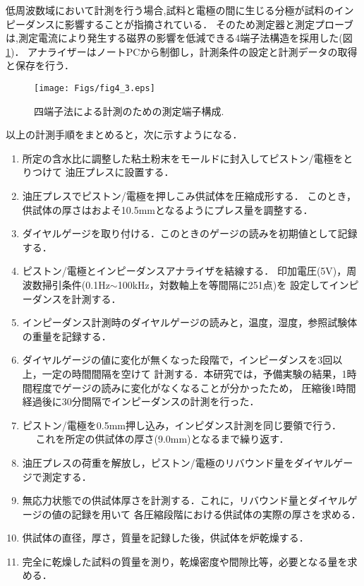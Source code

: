 低周波数域において計測を行う場合,試料と電極の間に生じる分極が試料のインピーダンスに影響することが指摘されている．
そのため測定器と測定プローブは,測定電流により発生する磁界の影響を低減できる4端子法構造を採用した(図\ref{fig:fig4_3})．
アナライザーはノートPCから制御し，計測条件の設定と計測データの取得と保存を行う．
\begin{figure}[h]
	\begin{center}
	\texttt{[image: Figs/fig4\_3.eps]} 
	\end{center}
	\caption{
		四端子法による計測のための測定端子構成.
	} 
	\label{fig:fig4_3}
\end{figure}
以上の計測手順をまとめると，次に示すようになる．
\begin{enumerate}
\item
	所定の含水比に調整した粘土粉末をモールドに封入してピストン/電極をとりつけて
	油圧プレスに設置する．
\item
	油圧プレスでピストン/電極を押しこみ供試体を圧縮成形する．
	このとき，供試体の厚さはおよそ10.5mmとなるようにプレス量を調整する．
\item
	ダイヤルゲージを取り付ける．このときのゲージの読みを初期値として記録する．
\item
	ピストン/電極とインピーダンスアナライザを結線する．
	印加電圧(5V)，周波数掃引条件(0.1Hz$\sim$100kHz，対数軸上を等間隔に251点)を
	設定してインピーダンスを計測する．
\item
	インピーダンス計測時のダイヤルゲージの読みと，温度，湿度，参照試験体の重量を記録する．
\item
	ダイヤルゲージの値に変化が無くなった段階で，インピーダンスを3回以上，一定の時間間隔を空けて
	計測する．本研究では，予備実験の結果，1時間程度でゲージの読みに変化がなくなることが分かったため，
	圧縮後1時間経過後に30分間隔でインピーダンスの計測を行った．
\item
	ピストン/電極を0.5mm押し込み，インピダンス計測を同じ要領で行う．
　	これを所定の供試体の厚さ(9.0mm)となるまで繰り返す．
\item
	油圧プレスの荷重を解放し，ピストン/電極のリバウンド量をダイヤルゲージで測定する．
\item
	無応力状態での供試体厚さを計測する．これに，リバウンド量とダイヤルゲージの値の記録を用いて
	各圧縮段階における供試体の実際の厚さを求める．
\item
	供試体の直径，厚さ，質量を記録した後，供試体を炉乾燥する．
\item
	完全に乾燥した試料の質量を測り，乾燥密度や間隙比等，必要となる量を求める．		
\end{enumerate}
